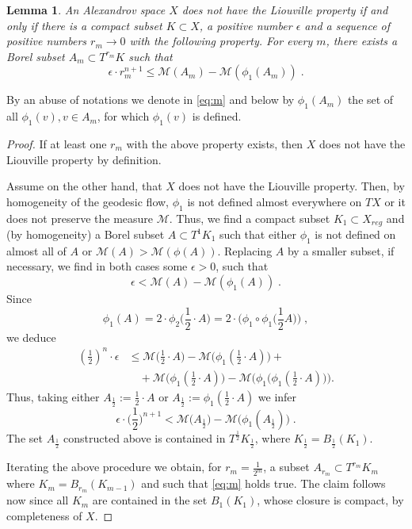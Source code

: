 \documentclass[12pt,leqno]{amsart}
\numberwithin{equation}{section}
\newtheorem{lem}[thm]{Lemma}
\theoremstyle{definition}
\theoremstyle{remark}
\begin{document}
\begin{lem} \label{infini}
An Alexandrov space $X$ \emph{does not} have the Liouville property if and only if there is a compact subset $K\subset X$, a positive number
$\epsilon$ and a sequence of positive numbers  $r_m \to 0$  with the following property.
 For every  $m$, there exists a Borel subset $A_m\subset T^{r_ m} K$ such that
 \begin{equation} \label{eq:m}
\epsilon \cdot r_m^{n +1} \leq \mathcal M (A_m) -\mathcal M (\phi _1 (A_m)) \;.
\end{equation}
\end{lem}
By an abuse of notations we denote in \eqref{eq:m}  and below by  $\phi_1 (A_m)$ the set of all $\phi _1(v), v\in A_m$, for which
$\phi _1(v)$ is defined.


\begin{proof}
If at least one $r_m$ with the above property exists, then $X$  does not have the Liouville property by  definition.

Assume on the other hand, that $X$ does not have the Liouville property. Then,  by homogeneity of the geodesic flow,  $\phi _1$ is not defined almost everywhere on $TX$ or it does not preserve the measure $\mathcal M$. Thus, we find a compact subset $K_1\subset X_{reg}$ and (by homogeneity) a Borel subset $A\subset T^1 K_1$ such that either $\phi_1$ is not defined on almost all of $A$ or $\mathcal M (A) > \mathcal M(\phi (A))$.  Replacing $A$
by a smaller  subset, if necessary,  we find in both cases some $\epsilon >0$, such that   $$\epsilon < \mathcal M (A) - \mathcal M(\phi_1 (A)) \; .$$
Since $$\phi_1 (A)=2\cdot \phi _2 \Big (\frac 1 2 \cdot A \Big)=2\cdot \Big(\phi _1 \circ \phi_1 \Big (\frac 1 2 A \Big ) \Big ) \; ,$$
we deduce
\begin{align*}
(\tfrac 1 2)^n \cdot \epsilon &\leq  \mathcal M \big(\tfrac 1 2\cdot  A \big) - \mathcal M \big( \phi_1 (\tfrac 1 2\cdot  A ) \big) +
\\
&\quad+\mathcal M \big(\phi_1 (\tfrac 1 2\cdot  A )\big)
 - \mathcal M\big (\phi_1 \big (\phi _1 (\tfrac 1 2\cdot  A )\big) \big).
\end{align*}
Thus,  taking  either $A_{\frac 1 2} := \frac 1 2  \cdot A$ or  $A_{\frac 1 2} := \phi_1 (\frac 1 2 \cdot A)$ we infer
$$\epsilon \cdot \Big(\frac 1 2 \Big )^{n+1}  < \mathcal M \big(A _{\frac 1 2} \big) - \mathcal M \big( \phi_1 (A _{\frac 1 2}) \big) \; .$$
The set $A_{\frac 1 2}$ constructed above is contained in $T^{\frac 1 2} K_{\frac 1 2}$, where $K _{\frac 1 2}  =B_{\frac 1 2} (K_1)$.

Iterating the above procedure we obtain,  for $r_m =\frac 1 {2^m}$,   a subset $A_{r_m} \subset T^{r_m} K_m$  where  $K_m =B_{r_m} (K_{m-1})$
 and such that \eqref{eq:m} holds true.
The claim follows now since all $K_m$ are contained in the set $B_1 (K_1)$, whose closure is  compact, by completeness of $X$.
\end{proof}
\end{document}
